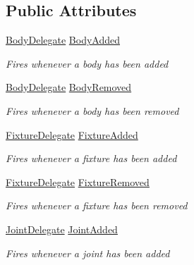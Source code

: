 \subsection*{Public Attributes}
\begin{DoxyCompactItemize}
\item 
\hyperlink{namespace_farseer_physics_1_1_dynamics_af77daabe9aac262e951d74f86d6c54dc}{Body\+Delegate} \hyperlink{class_farseer_physics_1_1_dynamics_1_1_world_a23cc22ac33248ec575e6844fe0715563}{Body\+Added}
\begin{DoxyCompactList}\small\item\em Fires whenever a body has been added \end{DoxyCompactList}\item 
\hyperlink{namespace_farseer_physics_1_1_dynamics_af77daabe9aac262e951d74f86d6c54dc}{Body\+Delegate} \hyperlink{class_farseer_physics_1_1_dynamics_1_1_world_a9bf365c2d2805a63d56c9a8974e204b0}{Body\+Removed}
\begin{DoxyCompactList}\small\item\em Fires whenever a body has been removed \end{DoxyCompactList}\item 
\hyperlink{namespace_farseer_physics_1_1_dynamics_a4b415cdd212573683a0002ac70b38c53}{Fixture\+Delegate} \hyperlink{class_farseer_physics_1_1_dynamics_1_1_world_a25a304b9454a91f7cad9581cc267e8e1}{Fixture\+Added}
\begin{DoxyCompactList}\small\item\em Fires whenever a fixture has been added \end{DoxyCompactList}\item 
\hyperlink{namespace_farseer_physics_1_1_dynamics_a4b415cdd212573683a0002ac70b38c53}{Fixture\+Delegate} \hyperlink{class_farseer_physics_1_1_dynamics_1_1_world_a146075da975590183e5f1834b6c5647a}{Fixture\+Removed}
\begin{DoxyCompactList}\small\item\em Fires whenever a fixture has been removed \end{DoxyCompactList}\item 
\hyperlink{namespace_farseer_physics_1_1_dynamics_a9da8e70b5e8c9bde4473fcf8e47d0fb1}{Joint\+Delegate} \hyperlink{class_farseer_physics_1_1_dynamics_1_1_world_ae36cf4ed417ecbf95c984b0f449d765c}{Joint\+Added}
\begin{DoxyCompactList}\small\item\em Fires whenever a joint has been added \end{DoxyCompactList}\item 

\end{DoxyCompactItemize}
